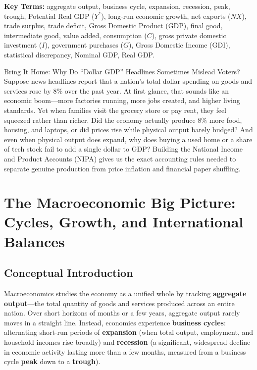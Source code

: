 \documentclass[11pt,letterpaper]{article}
\begin{document}
\noindent\textbf{Key Terms:} aggregate output, business cycle, expansion, recession, peak, trough, Potential Real GDP ($Y^*$), long-run economic growth, net exports ($NX$), trade surplus, trade deficit, Gross Domestic Product (GDP), final good, intermediate good, value added, consumption ($C$), gross private domestic investment ($I$), government purchases ($G$), Gross Domestic Income (GDI), statistical discrepancy, Nominal GDP, Real GDP.

\begin{examplecase}{Bring It Home: Why Do ``Dollar GDP'' Headlines Sometimes Mislead Voters?}
Suppose news headlines report that a nation's total dollar spending on goods and services rose by $8\%$ over the past year. At first glance, that sounds like an economic boom—more factories running, more jobs created, and higher living standards. Yet when families visit the grocery store or pay rent, they feel squeezed rather than richer. Did the economy actually produce $8\%$ more food, housing, and laptops, or did prices rise while physical output barely budged? And even when physical output does expand, why does buying a used home or a share of tech stock fail to add a single dollar to GDP? Building the National Income and Product Accounts (NIPA) gives us the exact accounting rules needed to separate genuine production from price inflation and financial paper shuffling.
\end{examplecase}

\section{The Macroeconomic Big Picture: Cycles, Growth, and International Balances}

\subsection*{Conceptual Introduction}
Macroeconomics studies the economy as a unified whole by tracking \textbf{aggregate output}—the total quantity of goods and services produced across an entire nation. Over short horizons of months or a few years, aggregate output rarely moves in a straight line. Instead, economies experience \textbf{business cycles}: alternating short-run periods of \textbf{expansion} (when total output, employment, and household incomes rise broadly) and \textbf{recession} (a significant, widespread decline in economic activity lasting more than a few months, measured from a business cycle \textbf{peak} down to a \textbf{trough}).
\end{document}
